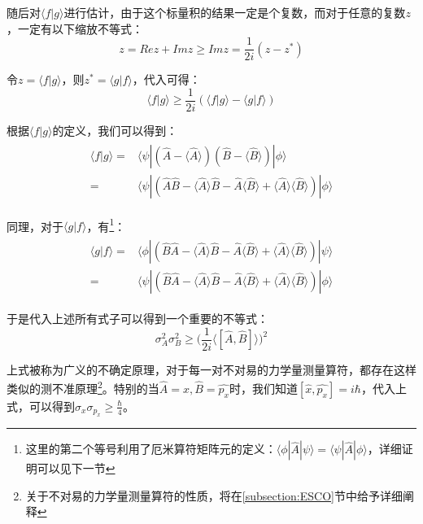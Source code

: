         随后对$\langle f|g\rangle$进行估计，由于这个标量积的结果一定是个复数，而对于任意的复数$z$，一定有以下缩放不等式：
        \begin{equation}
            z=Rez+Imz\geq Imz=\frac{1}{2i}(z-z^*)
        \end{equation}
        
        令$z=\langle f|g\rangle$，则$z^*=\langle g|f\rangle$，代入可得：
        \begin{equation}
            \langle f|g\rangle \geq \frac{1}{2i}(\langle f|g\rangle-\langle g|f\rangle)
        \end{equation}
        
        根据$\langle f|g\rangle$的定义，我们可以得到：
        \begin{align}
            \begin{split}
                \langle f|g\rangle=&\langle\psi|(\hat{A}-\langle\hat{A}\rangle)(\hat{B}-\langle\hat{B}\rangle)|\phi\rangle\\
                =&\langle\psi|(\hat{A}\hat{B}-\langle\hat{A}\rangle\hat{B}-\hat{A}\langle\hat{B}\rangle+\langle\hat{A}\rangle\langle\hat{B}\rangle)|\phi\rangle
            \end{split}
        \end{align}
        
        同理，对于$\langle g|f\rangle$，有\footnote{这里的第二个等号利用了厄米算符矩阵元的定义：$\langle\phi|\hat{A}|\psi\rangle=\langle\psi|\hat{A}|\phi\rangle$，详细证明可以见下一节}：
        \begin{align}
            \begin{split}
                \langle g|f\rangle=&\langle\phi|(\hat{B}\hat{A}-\langle\hat{A}\rangle\hat{B}-\hat{A}\langle\hat{B}\rangle+\langle\hat{A}\rangle\langle\hat{B}\rangle)|\psi\rangle\\
                =&\langle\psi|(\hat{B}\hat{A}-\langle\hat{A}\rangle\hat{B}-\hat{A}\langle\hat{B}\rangle+\langle\hat{A}\rangle\langle\hat{B}\rangle)|\phi\rangle
            \end{split}
        \end{align}
            
        于是代入上述所有式子可以得到一个重要的不等式：
        \begin{equation}
            \sigma_A^2\sigma_B^2\geq \Big(\frac{1}{2i}\langle [\hat{A},\hat{B}]\rangle\Big)^2
        \end{equation}
        
        上式被称为广义的不确定原理，对于每一对不对易的力学量测量算符，都存在这样类似的测不准原理\footnote{关于不对易的力学量测量算符的性质，将在\ref{subsection:ESCO}节中给予详细阐释}。特别的当$\hat{A}=\hat{x},\hat{B}=\hat{p_x}$时，我们知道$[\hat{x},\hat{p_x}]=i\hbar$，代入上式，可以得到$\sigma_x\sigma_{p_x}\geq\frac{\hbar}{4}$。
        
